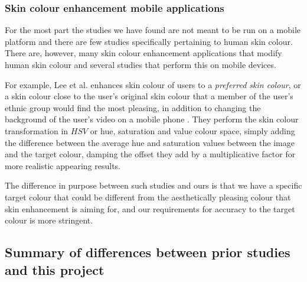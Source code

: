\subsubsection{Skin colour enhancement mobile applications}
For the most part the studies we have found are not meant to be run on a mobile platform and there are few studies specifically pertaining to human skin colour. There are, however, many skin colour enhancement applications that modify human skin colour and several studies that perform this on mobile devices.

For example, Lee et al. enhances skin colour of users to a \textit{preferred skin colour}, or a skin colour close to the user's original skin colour that a member of the user's ethnic group would find the most pleasing, in addition to changing the background of the user's video on a mobile phone \cite{lee_2010_mobile}. They perform the skin colour transformation in $HSV$ or hue, saturation and value colour space, simply adding the difference between the average hue and saturation values between the image and the target colour, damping the offset they add by a multiplicative factor for more realistic appearing results. 

The difference in purpose between such studies and ours is that we have a specific target colour that could be different from the aesthetically pleasing colour that skin enhancement is aiming for, and our requirements for accuracy to the target colour is more stringent.

\subsection{Summary of differences between prior studies and this project}

